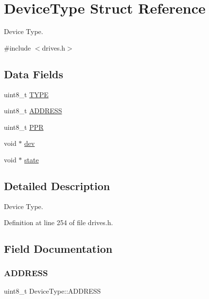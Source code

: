 \hypertarget{structDeviceType}{}\section{Device\+Type Struct Reference}
\label{structDeviceType}


Device Type.  




{\ttfamily \#include $<$drives.\+h$>$}

\subsection*{Data Fields}
\begin{DoxyCompactItemize}
\item 
uint8\+\_\+t \hyperlink{structDeviceType_acee5219162b6f47a9423b2086d127ede}{T\+Y\+PE}
\item 
uint8\+\_\+t \hyperlink{structDeviceType_a62529b7435785e39e8e7c5019303c2dd}{A\+D\+D\+R\+E\+SS}
\item 
uint8\+\_\+t \hyperlink{structDeviceType_ae0e59c6c17582ff80bdab3f2010e8d57}{P\+PR}
\item 
void $\ast$ \hyperlink{structDeviceType_a59fc3b3cb45f8ee0cd1016bd64804d3b}{dev}
\item 
void $\ast$ \hyperlink{structDeviceType_ad0fc43d63606bab6c259047e36512e08}{state}
\end{DoxyCompactItemize}


\subsection{Detailed Description}
Device Type. 

Definition at line 254 of file drives.\+h.



\subsection{Field Documentation}
\mbox{\label{structDeviceType_a62529b7435785e39e8e7c5019303c2dd}} 
\subsubsection{\texorpdfstring{A\+D\+D\+R\+E\+SS}{ADDRESS}}
{\footnotesize\ttfamily uint8\+\_\+t Device\+Type\+::\+A\+D\+D\+R\+E\+SS}



